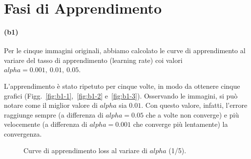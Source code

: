 \documentclass[a4paper,12pt]{article}
\begin{document}
\newpage
\section{Fasi di Apprendimento}

\paragraph{(b1)} Per le cinque immagini originali, abbiamo calcolato le curve di apprendimento al variare del tasso di apprendimento (learning rate) coi valori $alpha=0.001,~0.01,~0.05$. 

L'apprendimento è stato ripetuto per cinque volte, in modo da ottenere cinque grafici (Figg.~\vref{fig:b1-1},~\vref{fig:b1-2} e~\vref{fig:b1-3}). Osservando le immagini, si può notare come il miglior valore di $alpha$ sia $0.01$. Con questo valore, infatti, l'errore raggiunge sempre (a differenza di $alpha=0.05$ che a volte non converge) e più velocemente (a differenza di $alpha=0.001$ che converge più lentamente) la convergenza.

\begin{figure}[htb]
    \centering
    \caption{Curve di apprendimento loss al variare di $alpha$ (1/5).}
    \label{fig:b1-1}
\end{figure}
\end{document}
